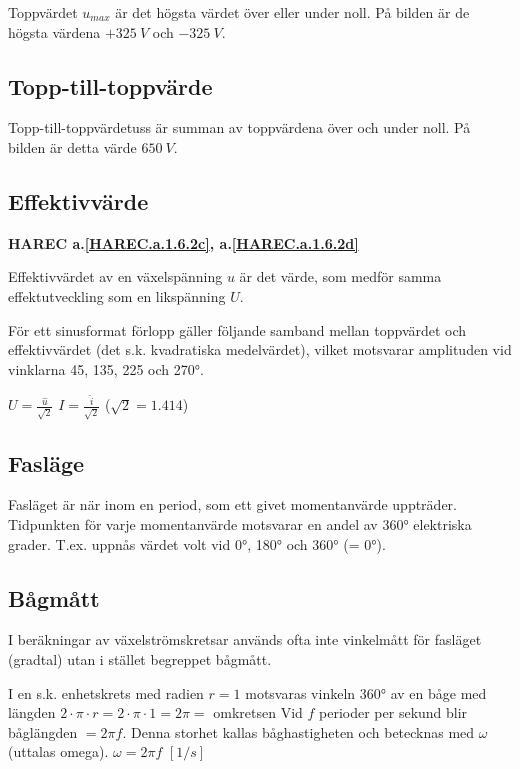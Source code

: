 Toppvärdet \(u_{max}\) är det högsta värdet över eller under noll. På bilden är
de högsta värdena \(+325\ V\) och \(-325\ V\).

\subsection{Topp-till-toppvärde}

Topp-till-toppvärdetuss är summan av toppvärdena över och under noll. På bilden
är detta värde \(650\ V\).

\subsection{Effektivvärde}
\textbf{HAREC a.\ref{HAREC.a.1.6.2c}, a.\ref{HAREC.a.1.6.2d}\label{myHAREC.a.1.6.2c}\label{myHAREC.a.1.6.2d}}

Effektivvärdet av en växelspänning \(u\) är det värde, som medför samma
effektutveckling som en likspänning \(U\).

För ett sinusformat förlopp gäller följande samband mellan toppvärdet och
effektivvärdet (det s.k. kvadratiska medelvärdet), vilket motsvarar amplituden
vid vinklarna 45, 135, 225 och 270°.

\(U=\frac{\hat{u}}{\sqrt{2}}\) \(I=\frac{\hat{i}}{\sqrt{2}}\) (\(\sqrt{2} = 1.414\))

\subsection{Fasläge}

Fasläget är när inom en period, som ett givet momentanvärde uppträder.
Tidpunkten för varje momentanvärde motsvarar en andel av 360° elektriska
grader. T.ex. uppnås värdet volt vid 0°, 180° och 360° (= 0°).

\subsection{Bågmått}

I beräkningar av växelströmskretsar används ofta inte vinkelmått för fasläget
(gradtal) utan i stället begreppet bågmått.

I en s.k. enhetskrets med radien \(r = 1\) motsvaras vinkeln 360° av en båge med
längden \(2 \cdot \pi \cdot r= 2 \cdot \pi \cdot 1 = 2 \pi =\) omkretsen
Vid \(f\) perioder per sekund blir båglängden \(= 2\pi f\). Denna storhet
kallas båghastigheten och betecknas med \(\omega\) (uttalas omega).
\(\omega= 2\pi f\) \([1/s]\)

